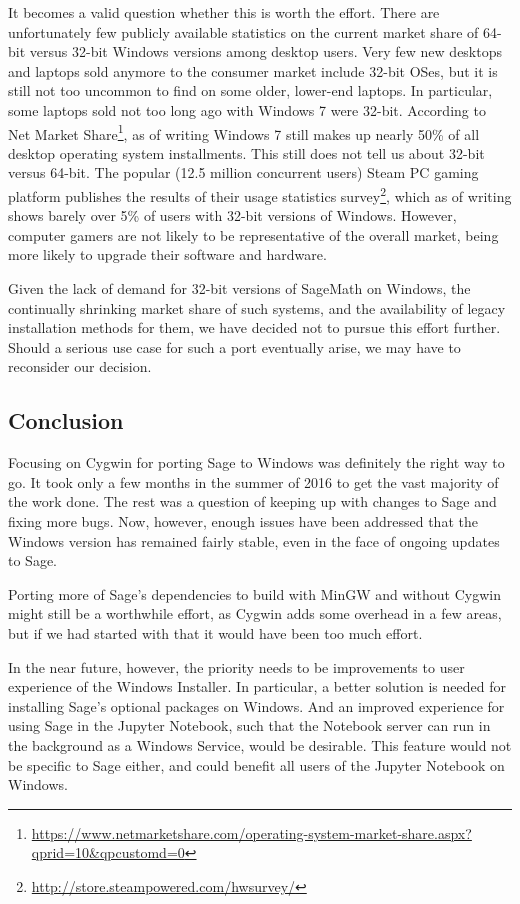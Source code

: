 It becomes a valid question whether this is worth the effort. There are
unfortunately few publicly available statistics on the current market
share of 64-bit versus 32-bit Windows versions among desktop users. Very
few new desktops and laptops sold anymore to the consumer market include
32-bit OSes, but it is still not too uncommon to find on some older,
lower-end laptops. In particular, some laptops sold not too long ago
with Windows 7 were 32-bit. According to Net Market Share\footnote{\url{https://www.netmarketshare.com/operating-system-market-share.aspx?qprid=10\&qpcustomd=0}},
as of writing Windows 7 still makes up nearly 50\% of all desktop
operating system installments. This still does not tell us about 32-bit
versus 64-bit. The popular (12.5 million concurrent users) Steam PC
gaming platform publishes the results of their usage statistics
survey\footnote{\url{http://store.steampowered.com/hwsurvey/}}, which as
of writing shows barely over 5\% of users with 32-bit versions of
Windows. However, computer gamers are not likely to be representative of
the overall market, being more likely to upgrade their software and
hardware.

Given the lack of demand for 32-bit versions of SageMath on Windows, the
continually shrinking market share of such systems, and the availability of
legacy installation methods for them, we have decided not to pursue this effort
further. Should a serious use case for such a port eventually arise, we may
have to reconsider our decision.

\hypertarget{conclusion}{%
\subsection{Conclusion}\label{conclusion}}

Focusing on Cygwin for porting Sage to Windows was definitely the right
way to go. It took only a few months in the summer of 2016 to get the
vast majority of the work done. The rest was a question of keeping
up with changes to Sage and fixing more bugs. Now, however, enough
issues have been addressed that the Windows version has remained fairly
stable, even in the face of ongoing updates to Sage.

Porting more of Sage's dependencies to build with MinGW and without
Cygwin might still be a worthwhile effort, as Cygwin adds some overhead
in a few areas, but if we had started with that it would have been too
much effort.

In the near future, however, the priority needs to be improvements to
user experience of the Windows Installer. In particular, a better
solution is needed for installing Sage's optional packages on Windows.
And an improved experience for using Sage in the Jupyter Notebook, such
that the Notebook server can run in the background as a Windows Service,
would be desirable. This feature would not be specific to Sage either, and
could benefit all users of the Jupyter Notebook on Windows.
